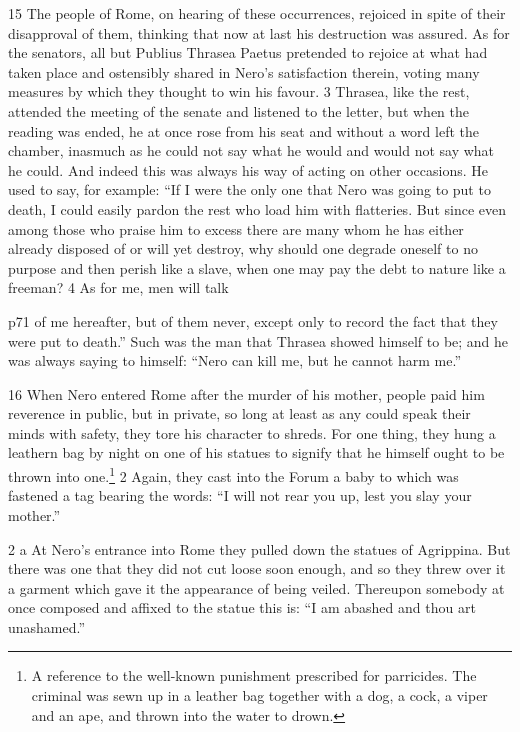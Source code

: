 15
The people of Rome, on hearing of these occurrences, rejoiced in spite of their disapproval of them, thinking that now at last his destruction was assured. As for the senators, all but Publius Thrasea Paetus pretended to rejoice at what had taken place and ostensibly shared in Nero's satisfaction therein, voting many measures by which they thought to win his favour. 3 Thrasea, like the rest, attended the meeting of the senate and listened to the letter, but when the reading was ended, he at once rose from his seat and without a word left the chamber, inasmuch as he could not say what he would and would not say what he could. And indeed this was always his way of acting on other occasions. He used to say, for example: ``If I were the only one that Nero was going to put to death, I could easily pardon the rest who load him with flatteries. But since even among those who praise him to excess there are many whom he has either already disposed of or will yet destroy, why should one degrade oneself to no purpose and then perish like a slave, when one may pay the debt to nature like a freeman? 4 As for me, men will talk

p71 of me hereafter, but of them never, except only to record the fact that they were put to death.'' Such was the man that Thrasea showed himself to be; and he was always saying to himself: ``Nero can kill me, but he cannot harm me.''

16
When Nero entered Rome after the murder of his mother, people paid him reverence in public, but in private, so long at least as any could speak their minds with safety, they tore his character to shreds. For one thing, they hung a leathern bag by night on one of his statues to signify that he himself ought to be thrown into one.\texthebrew{⁠}\footnote{A reference to the well-known punishment prescribed for parricides. The criminal was sewn up in a leather bag together with a dog, a cock, a viper and an ape, and thrown into the water to drown.

} 2 Again, they cast into the Forum a baby to which was fastened a tag bearing the words: ``I will not rear you up, lest you slay your mother.''

2 a At Nero's entrance into Rome they pulled down the statues of Agrippina. But there was one that they did not cut loose soon enough, and so they threw over it a garment which gave it the appearance of being veiled. Thereupon somebody at once composed and affixed to the statue this is: ``I am abashed and thou art unashamed.''


